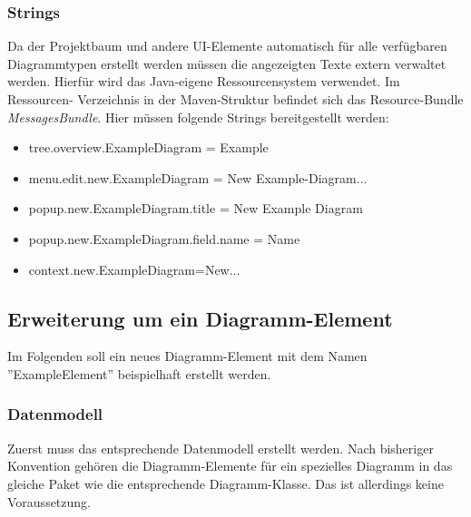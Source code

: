\subsubsection{Strings}
Da der Projektbaum und andere UI-Elemente automatisch für alle verfügbaren Diagrammtypen erstellt werden müssen
die angezeigten Texte extern verwaltet werden. Hierfür wird das Java-eigene Ressourcensystem verwendet. Im Ressourcen-
Verzeichnis in der Maven-Struktur befindet sich das Resource-Bundle \textit{MessagesBundle}. Hier müssen folgende Strings
bereitgestellt werden:

\begin{itemize}
	\item tree.overview.ExampleDiagram = Example
	\item menu.edit.new.ExampleDiagram = New Example-Diagram...
	\item popup.new.ExampleDiagram.title = New Example Diagram
	\item popup.new.ExampleDiagram.field.name = Name
	\item context.new.ExampleDiagram=New...
\end{itemize}

\pagebreak
\subsection{Erweiterung um ein Diagramm-Element}
\label{add_element}
Im Folgenden soll ein neues Diagramm-Element mit dem Namen ''ExampleElement'' beispielhaft erstellt werden.

\subsubsection{Datenmodell}
Zuerst muss das entsprechende Datenmodell erstellt werden. Nach bisheriger Konvention gehören die Diagramm-Elemente
für ein spezielles Diagramm in das gleiche Paket wie die entsprechende Diagramm-Klasse. Das ist allerdings keine
Voraussetzung.

